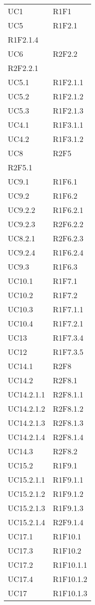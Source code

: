 \begin{longtable}{|C{6.5cm}|C{6.5cm}|}
	\tabularnewline

	UC1 & R1F1 \\
	UC5 & \centering R1F2.1 \\ R1F2.1.4 \tabularnewline
	UC6 & \centering R2F2.2 \\ R2F2.2.1 \tabularnewline
	UC5.1 & R1F2.1.1 \\
	UC5.2 & R1F2.1.2 \\
	UC5.3 & R1F2.1.3 \\
	UC4.1 & R1F3.1.1 \\
	UC4.2 & R1F3.1.2 \\
	UC8 & \centering R2F5 \\ R2F5.1 \tabularnewline
	UC9.1 & R1F6.1 \\
    UC9.2 & R1F6.2 \\
    UC9.2.2 & R1F6.2.1 \\
    UC9.2.3 & R2F6.2.2 \\
    UC8.2.1 & R2F6.2.3 \\
    UC9.2.4 & R1F6.2.4 \\
	UC9.3 & R1F6.3 \\
	UC10.1 & R1F7.1 \\
	UC10.2 & R1F7.2 \\
	UC10.3 & R1F7.1.1 \\
	UC10.4 & R1F7.2.1 \\
	UC13 & R1F7.3.4 \\
	UC12 & R1F7.3.5 \\
	UC14.1 & R2F8 \\
	UC14.2 & R2F8.1 \\
	UC14.2.1.1 & R2F8.1.1 \\
	UC14.2.1.2 & R2F8.1.2 \\
	UC14.2.1.3 & R2F8.1.3 \\
	UC14.2.1.4 & R2F8.1.4 \\
	UC14.3 & R2F8.2 \\
	UC15.2 & R1F9.1 \\
	UC15.2.1.1 & R1F9.1.1 \\
	UC15.2.1.2 & R1F9.1.2 \\
	UC15.2.1.3 & R1F9.1.3 \\
	UC15.2.1.4 & R2F9.1.4 \\
	UC17.1 & R1F10.1 \\
	UC17.3 & R1F10.2 \\
	UC17.2 & R1F10.1.1 \\
	UC17.4 & R1F10.1.2 \\
	UC17 & R1F10.1.3 \\

\end{longtable}
